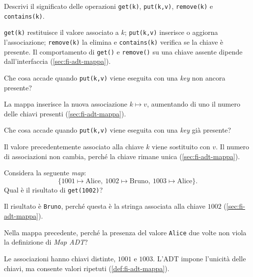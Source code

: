 \begin{exercise}
\label{ex:fi-esercizi-strutture-dati-map-operazioni}
Descrivi il significato delle operazioni \texttt{get(k)}, \texttt{put(k,v)},
\texttt{remove(k)} e \texttt{contains(k)}.
\end{exercise}

\texttt{get(k)} restituisce il valore associato a \(k\); \texttt{put(k,v)}
inserisce o aggiorna l'associazione; \texttt{remove(k)} la elimina e
\texttt{contains(k)} verifica se la chiave è presente. Il comportamento di
\texttt{get()} e \texttt{remove()} su una chiave assente dipende
dall'interfaccia (\cref{sec:fi-adt-mappa}).

\begin{exercise}
\label{ex:fi-esercizi-strutture-dati-map-put-nuova}
Che cosa accade quando \texttt{put(k,v)} viene eseguita con una \emph{key} non
ancora presente?
\end{exercise}

La mappa inserisce la nuova associazione \(k\mapsto v\), aumentando di uno il
numero delle chiavi presenti (\cref{sec:fi-adt-mappa}).

\begin{exercise}
\label{ex:fi-esercizi-strutture-dati-map-put-esistente}
Che cosa accade quando \texttt{put(k,v)} viene eseguita con una \emph{key} già
presente?
\end{exercise}

Il valore precedentemente associato alla chiave \(k\) viene sostituito con
\(v\). Il numero di associazioni non cambia, perché la chiave rimane unica
(\cref{sec:fi-adt-mappa}).

\begin{exercise}
\label{ex:fi-esercizi-strutture-dati-map-get-esempio}
Considera la seguente \emph{map}:
\[
  \{1001\mapsto\text{Alice},\ 1002\mapsto\text{Bruno},\
    1003\mapsto\text{Alice}\}.
\]
Qual è il risultato di \texttt{get(1002)}?
\end{exercise}

Il risultato è \texttt{Bruno}, perché questa è la stringa associata alla chiave
\(1002\) (\cref{sec:fi-adt-mappa}).

\begin{exercise}
\label{ex:fi-esercizi-strutture-dati-map-alice-due-volte}
Nella mappa precedente, perché la presenza del valore \texttt{Alice} due volte
non viola la definizione di \emph{Map ADT}?
\end{exercise}

Le associazioni hanno chiavi distinte, \(1001\) e \(1003\). L'ADT impone
l'unicità delle chiavi, ma consente valori ripetuti (\cref{def:fi-adt-mappa}).

